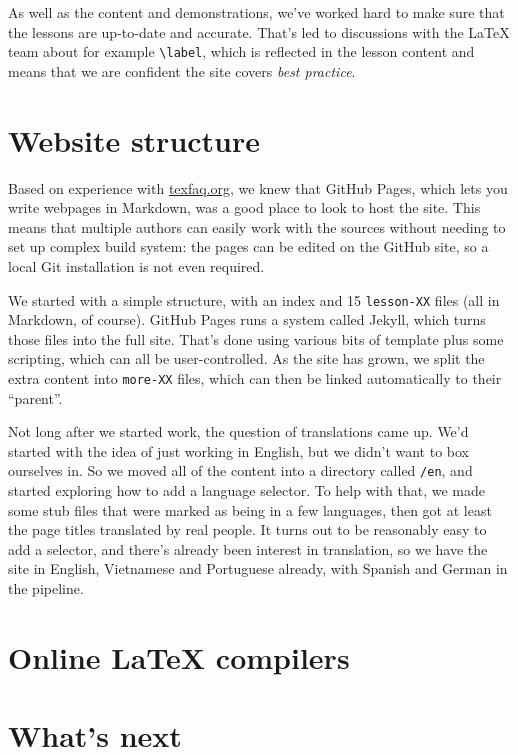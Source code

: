 \documentclass[harvardcite]{ltugboat}
\begin{document}
As well as the content and demonstrations, we've worked hard to make sure that
the lessons are up-to-date and accurate. That's led to discussions with the
\LaTeX{} team about for example \verb|\label|, which is reflected in the lesson
content and means that we are confident the site covers \emph{best practice}.

\section{Website structure}

Based on experience with \url{texfaq.org}, we knew that GitHub Pages, which
lets you write webpages in Markdown, was a good place to look to host the site.
This means that multiple authors can easily work with the sources without
needing to set up complex build system: the pages can be edited on the GitHub
site, so a local Git installation is not even required.

We started with a simple structure, with an index and 15 \texttt{lesson-XX}
files (all in Markdown, of course). GitHub Pages runs a system called Jekyll,
which turns those files into the full site. That's done using various bits of
template plus some scripting, which can all be user-controlled. As the site has
grown, we split the extra content into \texttt{more-XX} files, which can then
be linked automatically to their \enquote{parent}.

Not long after we started work, the question of translations came up. We'd started
with the idea of just working in English, but we didn't want to box ourselves in.
So we moved all of the content into a directory called \texttt{/en}, and started
exploring how to add a language selector. To help with that, we made some stub
files that were marked as being in a few languages, then got at least the
page titles translated by real people. It turns out to be reasonably easy
to add a selector, and there's already been interest in translation, so
we have the site in English, Vietnamese and Portuguese already, with Spanish
and German in the pipeline.

\section{Online \LaTeX{} compilers}

\section{What's next}
\end{document}

